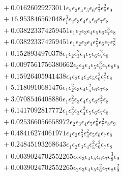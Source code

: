 \documentclass[10pt]{article}
\begin{document}
\begin{align*}
&{}  + 0.01626029273011 \epsilon_{2} \epsilon_{3} \epsilon_{4} \epsilon_{5} \epsilon_{6} \epsilon_{7}^{2} \epsilon_{8}^{2} \epsilon_{9} \\
&{}  + 16.953846567048 \epsilon_{1}^{3} \epsilon_{2} \epsilon_{3} \epsilon_{4} \epsilon_{5} \epsilon_{6} \epsilon_{7} \epsilon_{8} \\
&{}  + 0.038223374259451 \epsilon_{1} \epsilon_{2} \epsilon_{3} \epsilon_{4} \epsilon_{5} \epsilon_{6} \epsilon_{7}^{3} \epsilon_{8} \\
&{}  + 0.038223374259451 \epsilon_{1} \epsilon_{2} \epsilon_{3} \epsilon_{4} \epsilon_{5}^{2} \epsilon_{6} \epsilon_{7} \epsilon_{8}^{2} \\
&{}  + 0.1528934970378 \epsilon_{1} \epsilon_{2} \epsilon_{3}^{2} \epsilon_{4} \epsilon_{5} \epsilon_{6} \epsilon_{7}^{2} \epsilon_{8} \\
&{}  + 0.0097561756380662 \epsilon_{2} \epsilon_{3} \epsilon_{4} \epsilon_{5} \epsilon_{6}^{3} \epsilon_{7} \epsilon_{8} \epsilon_{9} \\
&{}  + 0.15926405941438 \epsilon_{1} \epsilon_{2} \epsilon_{3} \epsilon_{4} \epsilon_{5} \epsilon_{6}^{2} \epsilon_{7}^{2} \epsilon_{8} \\
&{}  + 5.1180910681476 \epsilon_{1} \epsilon_{2}^{2} \epsilon_{3} \epsilon_{4} \epsilon_{5}^{2} \epsilon_{6} \epsilon_{7} \epsilon_{8} \\
&{}  + 3.0708546408886 \epsilon_{1} \epsilon_{2}^{2} \epsilon_{3} \epsilon_{4} \epsilon_{5} \epsilon_{6} \epsilon_{7}^{2} \epsilon_{8} \\
&{}  + 6.1417092817772 \epsilon_{1} \epsilon_{2}^{2} \epsilon_{3} \epsilon_{4}^{2} \epsilon_{5} \epsilon_{6} \epsilon_{7} \epsilon_{8} \\
&{}  + 0.025366056658972 \epsilon_{2} \epsilon_{3} \epsilon_{4} \epsilon_{5} \epsilon_{6}^{2} \epsilon_{7}^{2} \epsilon_{8} \epsilon_{9} \\
&{}  + 0.48416274061971 \epsilon_{1} \epsilon_{2} \epsilon_{3}^{2} \epsilon_{4}^{2} \epsilon_{5} \epsilon_{6} \epsilon_{7} \epsilon_{8} \\
&{}  + 0.24845193268643 \epsilon_{1} \epsilon_{2} \epsilon_{3} \epsilon_{4} \epsilon_{5}^{2} \epsilon_{6}^{2} \epsilon_{7} \epsilon_{8} \\
&{}  + 0.0039024702552265 \epsilon_{2} \epsilon_{3} \epsilon_{4} \epsilon_{5} \epsilon_{6} \epsilon_{7} \epsilon_{8}^{3} \epsilon_{9} \\
&{}  + 0.0039024702552265 \epsilon_{2} \epsilon_{3} \epsilon_{4} \epsilon_{5} \epsilon_{6}^{2} \epsilon_{7} \epsilon_{8} \epsilon_{9}^{2} \\

\end{align*}
\end{document}
